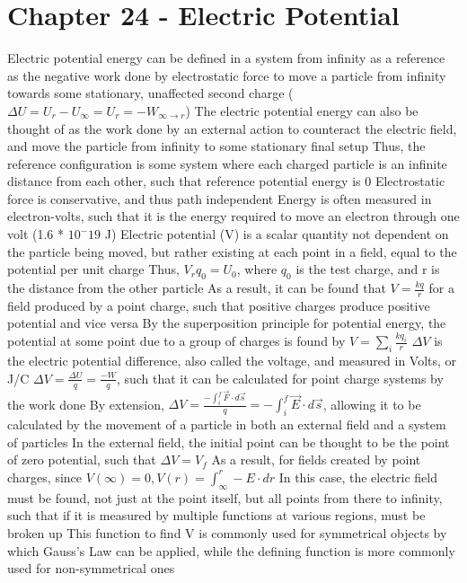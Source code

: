\documentclass[11 pt, twoside]{article}
\newenvironment{outline*}
{
	\begin{outline}[enumerate]
	}
	{\end{outline}
}
\begin{document}
\section{Chapter 24 - Electric Potential}
\begin{outline*}
\1 Electric potential energy can be defined in a system from infinity as a reference as the negative work done by electrostatic force to move a particle from infinity towards some stationary, unaffected second charge ($\Delta U = U_r - U_\infty = U_r = -W_{\infty \to r}$)
\2 The electric potential energy can also be thought of as the work done by an external action to counteract the electric field, and move the particle from infinity to some stationary final setup
\2 Thus, the reference configuration is some system where each charged particle is an infinite distance from each other, such that reference potential energy is 0
\2 Electrostatic force is conservative, and thus path independent
\2 Energy is often measured in electron-volts, such that it is the energy required to move an electron through one volt (1.6 * $10^-19$ J)
\1 Electric potential (V) is a scalar quantity not dependent on the particle being moved, but rather existing at each point in a field, equal to the potential per unit charge
\2 Thus, $V_rq_0 = U_0$, where $q_0$ is the test charge, and r is the distance from the other particle
\2 As a result, it can be found that $V = \frac{kq}{r}$ for a field produced by a point charge, such that positive charges produce positive potential and vice versa
\3 By the superposition principle for potential energy, the potential at some point due to a group of charges is found by $V = \sum_i \frac{kq_i}{r}$
\1 $\Delta V$ is the electric potential difference, also called the voltage, and measured in Volts, or J/C
\2 $\Delta V = \frac{\Delta U}{q} = \frac{-W}{q}$, such that it can be calculated for point charge systems by the work done
\2 By extension, $\Delta V = \frac{-\int^f_i \vec{F}\cdot d\vec{s}}{q} = -\int^f_i \vec{E} \cdot d\vec{s}$, allowing it to be calculated by the movement of a particle in both an external field and a system of particles
\3 In the external field, the initial point can be thought to be the point of zero potential, such that $\Delta V = V_f$
\3 As a result, for fields created by point charges, since $V(\infty) = 0, V(r) = \int^r_\infty -E \cdot dr$
\4 In this case, the electric field must be found, not just at the point itself, but all points from there to infinity, such that if it is measured by multiple functions at various regions, must be broken up
\4 This function to find V is commonly used for symmetrical objects by which Gauss's Law can be applied, while the defining function is more commonly used for non-symmetrical ones

\end{outline*}
\end{document}
